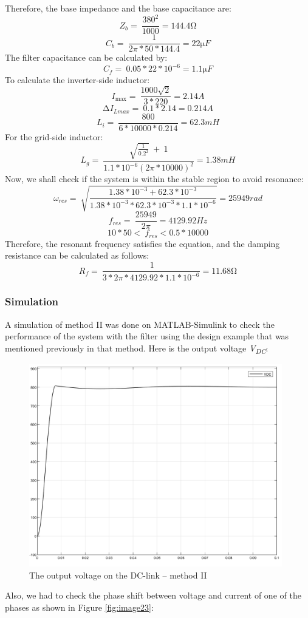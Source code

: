 \documentclass[12pt,a4paper]{book}
\begin{document}
Therefore, the base impedance and the base capacitance are:
\[Z_{b} = \ \frac{380^{2}}{1000} = 144.4\mathrm{\Omega}\]
\[C_{b} = \ \frac{1}{2\pi*50*144.4} = 22\mathrm{\mu}F\]
The filter capacitance can be calculated by:
\[C_{f} = \ 0.05*22*10^{- 6} = 1.1\mathrm{\mu}F\]
To calculate the inverter-side inductor:
\[I_{\max} = \ \frac{1000\sqrt{2}}{3*220} = 2.14A\]
\[{\mathrm{\Delta}I}_{Lmax} = \ 0.1*2.14 = 0.214A\]
\[L_{i} = \ \frac{800}{6*10000*0.214} = 62.3mH\]
For the grid-side inductor:
\[L_{g} = \ \frac{\sqrt{\frac{1}{{0.2}^{2}}}\  + \ 1}{1.1*10^{- 6}{(2\pi*10000)}^{2}} = 1.38mH\]
Now, we shall check if the system is within the stable region to avoid resonance:
\[\omega_{res} = \ \sqrt{\frac{1.38*10^{- 3} + 62.3*10^{- 3}}{1.38*10^{- 3}*62.3*10^{- 3}*1.1*10^{- 6}}} = 25949rad\]
\[f_{res} = \ \frac{25949}{2\pi} = 4129.92Hz\]
\[10*50 < \ f_{res} < 0.5*10000\]
Therefore, the resonant frequency satisfies the equation, and the damping resistance can be calculated as follows:
\[R_{f} = \ \frac{\ 1}{3*2\pi*4129.92*1.1*10^{- 6}} = 11.68\mathrm{\Omega}\]

\subsubsection{Simulation}
A simulation of method II was done on MATLAB-Simulink to check the performance of the system with the filter using the design example that was mentioned previously in that method. Here is the output voltage \emph{V\textsubscript{DC}}:

\begin{figure}[h!]
  \centering
  \includegraphics[width=11cm]{image22.png}
  \caption{The output voltage on the DC-link -- method II}
  \label{fig:image22}
\end{figure}
Also, we had to check the phase shift between voltage and current of one of the phases as shown in Figure \ref{fig:image23}:
\end{document}
